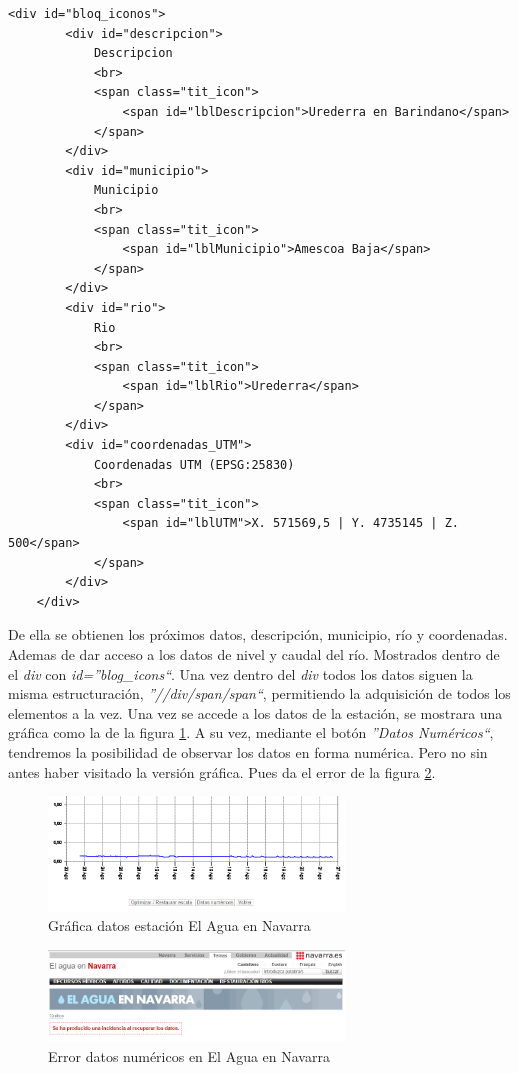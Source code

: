 \begin{lstlisting}[basicstyle=\footnotesize, caption={HTML estaciones en El Agua en Navarra}]
	<div id="bloq_iconos">
		<div id="descripcion">
			Descripcion
			<br>
			<span class="tit_icon">
				<span id="lblDescripcion">Urederra en Barindano</span>
			</span>
		</div>
		<div id="municipio">
			Municipio
			<br>
			<span class="tit_icon">
				<span id="lblMunicipio">Amescoa Baja</span>
			</span>
		</div>
		<div id="rio">
			Rio
			<br>
			<span class="tit_icon">
				<span id="lblRio">Urederra</span>
			</span>
		</div>
		<div id="coordenadas_UTM">
			Coordenadas UTM (EPSG:25830)
			<br>
			<span class="tit_icon">
				<span id="lblUTM">X. 571569,5 | Y. 4735145 | Z. 500</span>
			</span>
		</div>
	</div>
\end{lstlisting}

De ella se obtienen los próximos datos, descripción, municipio, río y coordenadas. Ademas de dar acceso a los datos de nivel y caudal del río. Mostrados dentro de el \textit{div} con \textit{id=''blog\_icons``}. Una vez dentro del \textit{div} todos los datos siguen la misma estructuración, \textit{''//div/span/span``}, permitiendo la adquisición de todos los elementos a la vez.\newline
\newline
Una vez se accede a los datos de la estación, se mostrara una gráfica como la de la figura \ref{fig:ej25}. A su vez, mediante el botón \textit{''Datos Numéricos``}, tendremos la posibilidad de observar los datos en forma numérica. Pero no sin antes haber visitado la versión gráfica. Pues da el error de la figura \ref{fig:ej5}.

\begin{figure} [H]
	\centering
	\includegraphics[width=0.7\textwidth]{fig/AguaEnNavarraGrafica.png}
	\caption[Gráfica de datos en estación de El Agua en Navarra]{Gráfica datos estación El Agua en Navarra}
	\label{fig:ej25}
\end{figure}

\begin{figure} [H]
	\centering
	\includegraphics[width=0.7\textwidth]{fig/ErrorAguaEnNavarra.png}
	\caption[Error al cargar directamente la página de datos numéricos en El Agua en Navarra]{Error datos numéricos en El Agua en Navarra}
	\label{fig:ej5}
\end{figure}

